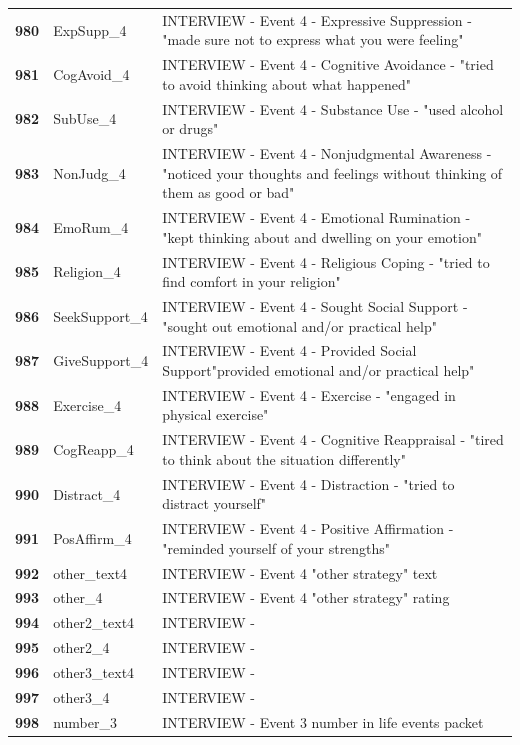 \documentclass[
  letterpaper,
  DIV=11,
  numbers=noendperiod]{scrartcl}
\begin{document}
\begin{longtable}[t]{>{}cll}
\textbf{980} & ExpSupp\_4 & INTERVIEW - Event 4 - Expressive Suppression - "made sure not to express what you were feeling"\\
\addlinespace
\textbf{981} & CogAvoid\_4 & INTERVIEW - Event 4 - Cognitive Avoidance - "tried to avoid thinking about what happened"\\
\textbf{982} & SubUse\_4 & INTERVIEW - Event 4 - Substance Use - "used alcohol or drugs"\\
\textbf{983} & NonJudg\_4 & INTERVIEW - Event 4 - Nonjudgmental Awareness - "noticed your thoughts and feelings without thinking of them as good or bad"\\
\textbf{984} & EmoRum\_4 & INTERVIEW - Event 4 - Emotional Rumination - "kept thinking about and dwelling on your emotion"\\
\textbf{985} & Religion\_4 & INTERVIEW - Event 4 - Religious Coping - "tried to find comfort in your religion"\\
\addlinespace
\textbf{986} & SeekSupport\_4 & INTERVIEW - Event 4 - Sought Social Support - "sought out emotional and/or practical help"\\
\textbf{987} & GiveSupport\_4 & INTERVIEW - Event 4 - Provided Social Support"provided emotional and/or practical help"\\
\textbf{988} & Exercise\_4 & INTERVIEW - Event 4 - Exercise - "engaged in physical exercise"\\
\textbf{989} & CogReapp\_4 & INTERVIEW - Event 4 - Cognitive Reappraisal - "tired to think about the situation differently"\\
\textbf{990} & Distract\_4 & INTERVIEW - Event 4 - Distraction - "tried to distract yourself"\\
\addlinespace
\textbf{991} & PosAffirm\_4 & INTERVIEW - Event 4 - Positive Affirmation - "reminded yourself of your strengths"\\
\textbf{992} & other\_text4 & INTERVIEW - Event 4 "other strategy" text\\
\textbf{993} & other\_4 & INTERVIEW - Event 4 "other strategy" rating\\
\textbf{994} & other2\_text4 & INTERVIEW -\\
\textbf{995} & other2\_4 & INTERVIEW -\\
\addlinespace
\textbf{996} & other3\_text4 & INTERVIEW -\\
\textbf{997} & other3\_4 & INTERVIEW -\\
\textbf{998} & number\_3 & INTERVIEW - Event 3 number in life events packet\\

\end{longtable}
\end{document}
